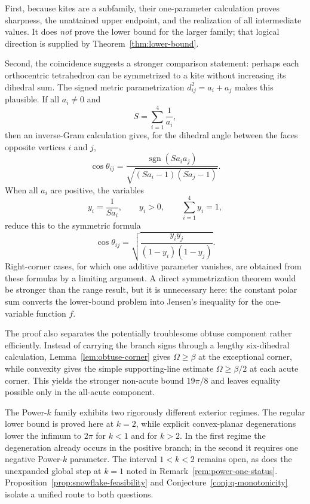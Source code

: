 \documentclass[11pt,a4paper]{article}
\theoremstyle{definition}
\theoremstyle{remark}
\begin{document}
First, because kites are a subfamily, their one-parameter calculation proves
sharpness, the unattained upper endpoint, and the realization of all
intermediate values.  It does \emph{not} prove the lower bound for the larger
family; that logical direction is supplied by Theorem~\ref{thm:lower-bound}.

Second, the coincidence suggests a stronger comparison statement: perhaps
each orthocentric tetrahedron can be symmetrized to a kite without increasing
its dihedral sum.  The signed metric parametrization
$d_{ij}^2=a_i+a_j$ makes this plausible.  If all $a_i\ne0$ and
\[
 S=\sum_{i=1}^4\frac1{a_i},
\]
then an inverse-Gram calculation gives, for the dihedral angle between the
faces opposite vertices $i$ and $j$,
\begin{equation}\label{eq:direct-dihedral}
 \cos\theta_{ij}
 =\frac{\operatorname{sgn}(Sa_ia_j)}
 {\sqrt{(Sa_i-1)(Sa_j-1)}}.
\end{equation}
When all $a_i$ are positive, the variables
\[
 y_i=\frac1{Sa_i},
 \qquad y_i>0,
 \qquad \sum_{i=1}^4y_i=1,
\]
reduce this to the symmetric formula
\begin{equation}\label{eq:y-dihedral}
 \cos\theta_{ij}
 =\sqrt{\frac{y_i y_j}{(1-y_i)(1-y_j)}}.
\end{equation}
Right-corner cases, for which one additive parameter vanishes, are obtained
from these formulas by a limiting argument.  A direct symmetrization theorem
would be stronger than the range result, but it is unnecessary here: the
constant polar sum converts the lower-bound problem into Jensen's inequality
for the one-variable function $f$.

The proof also separates the potentially troublesome obtuse component rather
efficiently.  Instead of carrying the branch signs through a lengthy
six-dihedral calculation, Lemma~\ref{lem:obtuse-corner} gives
$\Omega\geq\beta$ at the exceptional corner, while convexity gives the simple
supporting-line estimate $\Omega\geq\beta/2$ at each acute corner.  This yields
the stronger non-acute bound $19\pi/8$ and leaves equality possible only in
the all-acute component.

The Power-$k$ family exhibits two rigorously different exterior regimes.
The regular lower bound is proved here at $k=2$, while explicit convex-planar
degenerations lower the infimum to $2\pi$ for $k<1$ and for $k>2$.  In the
first regime the degeneration already occurs in the positive branch; in the
second it requires one negative Power-$k$ parameter.  The interval
$1<k<2$ remains open, as does the unexpanded global step at $k=1$ noted in
Remark~\ref{rem:power-one-status}.  Proposition~\ref{prop:snowflake-feasibility}
and Conjecture~\ref{conj:q-monotonicity} isolate a unified route to both
questions.
\end{document}
